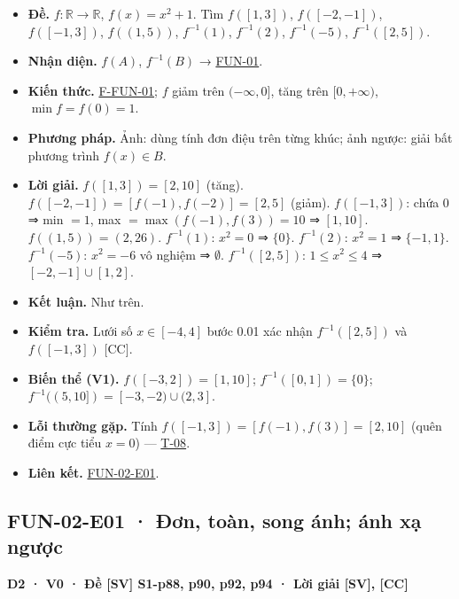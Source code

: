 \documentclass[
  10pt,
  twoside,openany]{book}
\providecommand{\tightlist}{%
  \setlength{\itemsep}{0pt}\setlength{\parskip}{0pt}}
\begin{document}
\begin{itemize}
\tightlist
\item
  \textbf{Đề.} \(f:\mathbb R\to\mathbb R\), \(f(x)=x^2+1\). Tìm
  \(f([1,3])\), \(f([-2,-1])\), \(f([-1,3])\), \(f((1,5))\),
  \(f^{-1}(1)\), \(f^{-1}(2)\), \(f^{-1}(-5)\), \(f^{-1}([2,5])\).
\item
  \textbf{Nhận diện.} \(f(A)\), \(f^{-1}(B)\) →
  \protect\hyperlink{FUN-01}{FUN-01}.
\item
  \textbf{Kiến thức.} \protect\hyperlink{F-FUN-01}{F-FUN-01}; \(f\) giảm
  trên \((-\infty,0]\), tăng trên \([0,+\infty)\), \(\min f=f(0)=1\).
\item
  \textbf{Phương pháp.} Ảnh: dùng tính đơn điệu trên từng khúc; ảnh
  ngược: giải bất phương trình \(f(x)\in B\).
\item
  \textbf{Lời giải.} \(f([1,3])=[2,10]\) (tăng).
  \(f([-2,-1])=[f(-1),f(-2)]=[2,5]\) (giảm). \(f([-1,3])\): chứa \(0\) ⇒
  min \(=1\), max \(=\max(f(-1),f(3))=10\) ⇒ \([1,10]\).
  \(f((1,5))=(2,26)\). \(f^{-1}(1)\): \(x^2=0\) ⇒ \(\{0\}\).
  \(f^{-1}(2)\): \(x^2=1\) ⇒ \(\{-1,1\}\). \(f^{-1}(-5)\): \(x^2=-6\) vô
  nghiệm ⇒ \(\emptyset\). \(f^{-1}([2,5])\): \(1\le x^2\le4\) ⇒
  \([-2,-1]\cup[1,2]\).
\item
  \textbf{Kết luận.} Như trên.
\item
  \textbf{Kiểm tra.} Lưới số \(x\in[-4,4]\) bước 0.01 xác nhận
  \(f^{-1}([2,5])\) và \(f([-1,3])\) {[}CC{]}.
\item
  \textbf{Biến thể (V1).} \(f([-3,2])=[1,10]\); \(f^{-1}([0,1])=\{0\}\);
  \(f^{-1}((5,10])=[-3,-2)\cup(2,3]\).
\item
  \textbf{Lỗi thường gặp.} Tính \(f([-1,3])=[f(-1),f(3)]=[2,10]\) (quên
  điểm cực tiểu \(x=0\)) --- \protect\hyperlink{T-08}{T-08}.
\item
  \textbf{Liên kết.} \protect\hyperlink{FUN-02-E01}{FUN-02-E01}.
\end{itemize}

\hypertarget{FUN-02-E01}{%
\subsection{FUN-02-E01 · Đơn, toàn, song ánh; ánh xạ
ngược}\label{FUN-02-E01}}

\textbf{D2 · V0 · Đề {[}SV{]} S1-p88, p90, p92, p94 · Lời giải {[}SV{]},
{[}CC{]}}
\end{document}
